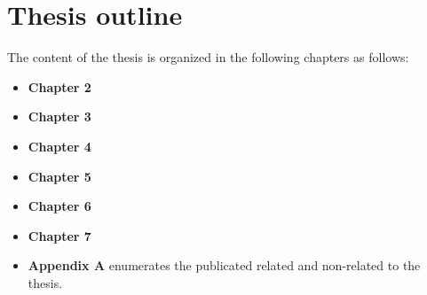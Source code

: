 \newpage 
\section{Thesis outline}
The content of the thesis is organized in the following chapters as follows:
\begin{itemize}
\item \textbf{Chapter 2}
\item \textbf{Chapter 3}
\item \textbf{Chapter 4}
\item \textbf{Chapter 5}
\item \textbf{Chapter 6}
\item \textbf{Chapter 7}
\item \textbf{Appendix A} enumerates the publicated related and non-related to the thesis. 
\end{itemize}


